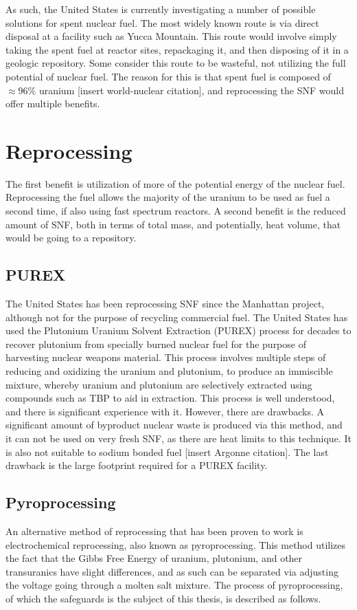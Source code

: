 As such, the United States is currently investigating a number of possible solutions for spent nuclear fuel. The most widely known route is via direct disposal at a facility such as Yucca Mountain. This route would involve simply taking the spent fuel at reactor sites, repackaging it, and then disposing of it in a geologic repository. Some consider this route to be wasteful, not utilizing the full potential of nuclear fuel. The reason for this is that spent fuel is composed of $\approx 96\%$ uranium [insert world-nuclear citation], and reprocessing the SNF would offer multiple benefits. \\

\section{Reprocessing}
The first benefit is utilization of more of the potential energy of the nuclear fuel. Reprocessing the fuel allows the majority of the uranium to be used as fuel a second time, if also using fast spectrum reactors. A second benefit is the reduced amount of SNF, both in terms of total mass, and potentially, heat volume, that would be going to a repository. \\
\subsection{PUREX}
The United States has been reprocessing SNF since the Manhattan project, although not for the purpose of recycling commercial fuel. The United States has used the Plutonium Uranium Solvent Extraction (PUREX) process for decades to recover plutonium from specially burned nuclear fuel for the purpose of harvesting nuclear weapons material. This process involves multiple steps of reducing and oxidizing the uranium and plutonium, to produce an immiscible mixture, whereby uranium and plutonium are selectively extracted using compounds such as TBP to aid in extraction. This process is well understood, and there is significant experience with it. However, there are drawbacks. A significant amount of byproduct nuclear waste is produced via this method, and it can not be used on very fresh SNF, as there are heat limits to this technique. It is also not suitable to sodium bonded fuel [insert Argonne citation]. The last drawback is the large footprint required for a PUREX facility. \\
\subsection{Pyroprocessing}
An alternative method of reprocessing that has been proven to work is electrochemical reprocessing, also known as pyroprocessing. This method utilizes the fact that the Gibbs Free Energy of uranium, plutonium, and other transuranics have slight differences, and as such can be separated via adjusting the voltage going through a molten salt mixture. The process of pyroprocessing, of which the safeguards is the subject of this thesis, is described as follows. \\ %

